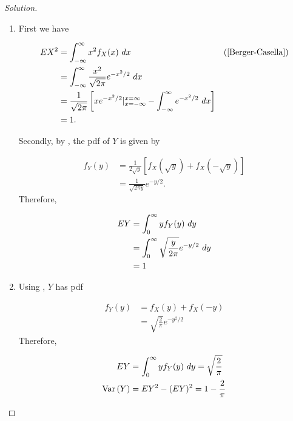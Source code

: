 \documentclass[12pt,letterpaper,reqno]{amsart}
\numberwithin{equation}{subsection}
\begin{document}
\begin{proof}[Solution]~\\

\begin{enumerate}[label=(\alph*),leftmargin=*]
    \item First we have
    
    \begin{align*}
        EX^2 &= \myint{x^2 f_X(x)}{x}{-\infty}{\infty} & \left(\mbox{\cite[Definition 2.2.1 on page 55]{Berger-Casella}} \right) \\
        &= \myint{\frac{x^2}{\sqrt{2\pi}} e^{-x^2/2}}{x}{-\infty}{\infty} \\
        &= \frac{1}{\sqrt{2\pi}} \left[ xe^{-x^2/2} \vert^{x = \infty}_{x = -\infty} - \myint{e^{-x^2/2}}{x}{-\infty}{\infty} \right] \\
        &= 1.
    \end{align*}
    
    Secondly, by \cite[Example 2.1.7 on page 52]{Berger-Casella}, the pdf of $Y$ is given by
    
    \begin{align*}
        f_Y(y) &= \frac{1}{2 \sqrt{y}} \left[ f_X( \sqrt{y}) + f_X(-\sqrt{y}) \right] \\
        &= \frac{1}{\sqrt{2 \pi y}} e^{-y/2}.
    \end{align*}
    Therefore,
    
    \begin{align*}
        EY &= \myint{yf_Y(y)}{y}{0}{\infty} \\
           &= \myint{\sqrt{\frac{y}{2\pi}} e^{-y/2}}{y}{0}{\infty} \\
           &= 1
    \end{align*}
    
    \item Using \cite[Theorem 2.1.8 on page 53]{Berger-Casella}, $Y$ has pdf
    
    \begin{align*}
        f_Y(y) &= f_X(y) + f_X(-y) \\
               &= \sqrt{\frac{2}{\pi}} e^{-y^2/2}
    \end{align*}
    Therefore,
    
    \begin{align*}
        EY &= \myint{yf_Y(y)}{y}{0}{\infty} = \sqrt{\frac{2}{\pi}} \\
         \Var{Y} &= EY^2 - (EY)^2 = 1 - \frac{2}{\pi}
    \end{align*}
\end{enumerate}
\end{proof}
\end{document}
